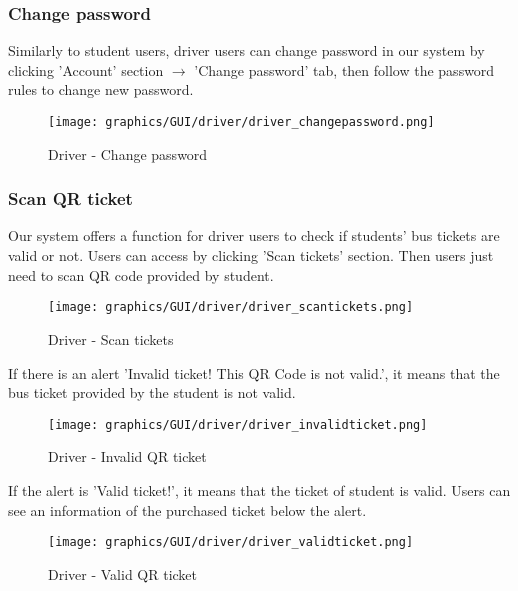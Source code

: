         \subsubsection{Change password}
                \noindent Similarly to student users, driver users can change password in our system by clicking 'Account' section $\rightarrow$ 'Change password' tab, then follow the password rules to change new password.
                    \begin{figure}[H]
                        \centering
                        \texttt{[image: graphics/GUI/driver/driver\_changepassword.png]}
                        \caption{Driver - Change password}
                    \label{fig:driver_changepassword}
                    \end{figure}
                    
        \subsubsection{Scan QR ticket}
                \noindent Our system offers a function for driver users to check if students' bus tickets are valid or not. Users can access by clicking 'Scan tickets' section. Then users just need to scan QR code provided by student.
                    \begin{figure}[H]
                        \centering
                        \texttt{[image: graphics/GUI/driver/driver\_scantickets.png]}
                        \caption{Driver - Scan tickets}
                    \label{fig:driver_scantickets}
                    \end{figure}
                \noindent If there is an alert 'Invalid ticket! This QR Code is not valid.', it means that the bus ticket provided by the student is not valid.
                    \begin{figure}[H]
                            \centering
                            \texttt{[image: graphics/GUI/driver/driver\_invalidticket.png]}
                            \caption{Driver - Invalid QR ticket}
                        \label{fig:driver_invalidticket}
                    \end{figure}
                    
                \noindent If the alert is 'Valid ticket!', it means that the ticket of student is valid. Users can see an information of the purchased ticket below the alert.
                    \begin{figure}[H]
                            \centering
                            \texttt{[image: graphics/GUI/driver/driver\_validticket.png]}
                            \caption{Driver - Valid QR ticket}
                        \label{fig:driver_validticket}
                    \end{figure}

